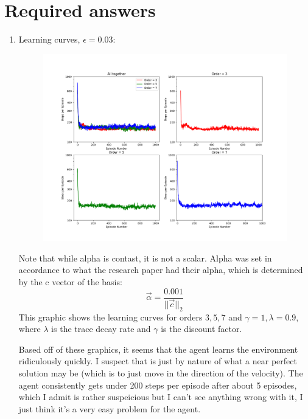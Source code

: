 \documentclass{article}
\begin{document}
\section{Required answers}
\begin{enumerate}
    \item Learning curves, $ \epsilon = 0.03 $:

    \begin{figure}[h]
        \centerline{\includegraphics[width=\columnwidth]{images/2by2.png}}
    \end{figure}
    Note that while alpha is contast, it is not a scalar. 
    Alpha was set in accordance to what the research paper had their alpha, which is
    determined by the c vector of the basis:
    $$ \vec{\alpha} = \frac{0.001}{||\vec{c}||_2} $$
    This graphic shows the learning curves for orders $ 3, 5, 7 $ and $ \gamma=1, \lambda=0.9 $, 
    where $ \lambda $ is the trace decay rate and $ \gamma $ is the discount factor. 

    Based off of these graphics, it seems that the agent learns the environment ridiculously quickly. 
    I suspect that is just by nature of what a near perfect solution may be (which is to just move in the
    direction of the velocity). The agent consistently gets under 200 steps per episode after about 5 episodes, which
    I admit is rather suspeicious but I can't see anything wrong with it, I just think it's a very easy problem for the agent. 


\end{enumerate}
\end{document}
